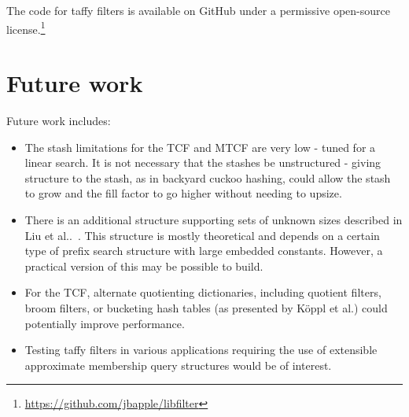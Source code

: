 \documentclass[letterpaper,twocolumn,10pt]{article}
\newcommand{\etal}{et al.}
\begin{document}
The code for taffy filters is available on GitHub under a permissive open-source license.\ifanon\else\footnote{\url{https://github.com/jbapple/libfilter}}\fi









\section{Future work}
\label{conclusion}

Future work includes:

\begin{itemize}
\item The stash limitations for the TCF and MTCF are very low - tuned for a linear search.
It is not necessary that the stashes be unstructured - giving structure to the stash, as in backyard cuckoo hashing, could allow the stash to grow and the fill factor to go higher without needing to upsize.~\cite{backyard}

\item There is an additional structure supporting sets of unknown sizes described in Liu \etal.~\cite{unknown-prefix}.
This structure is mostly theoretical and depends on a certain type of prefix search structure with large embedded constants.
However, a practical version of this may be possible to build.

\item For the TCF, alternate quotienting dictionaries, including quotient filters, broom filters, or bucketing hash tables (as presented by K\"oppl \etal{}) could potentially improve performance.~\cite{raman-practical,broom,quotient-filter}

\item Testing taffy filters in various applications requiring the use of extensible approximate membership query structures would be of interest.
\end{itemize}
\end{document}
